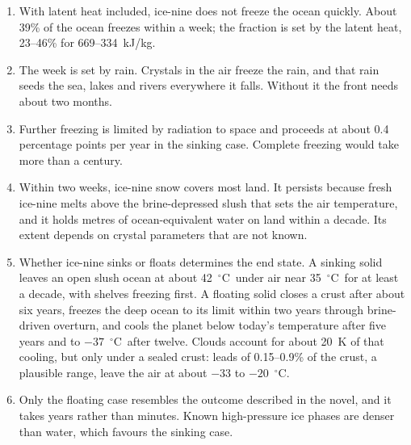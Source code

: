 \documentclass[11pt,a4paper]{article}
\newcommand{\degC}{$^{\circ}$C}
\begin{document}
\begin{enumerate}
\item With latent heat included, ice-nine does not freeze the ocean quickly. About 39\% of the ocean freezes within a week; the fraction is set by the latent heat, 23--46\% for 669--334~kJ/kg.
\item The week is set by rain. Crystals in the air freeze the rain, and that rain seeds the sea, lakes and rivers everywhere it falls. Without it the front needs about two months.
\item Further freezing is limited by radiation to space and proceeds at about 0.4 percentage points per year in the sinking case. Complete freezing would take more than a century.
\item Within two weeks, ice-nine snow covers most land. It persists because fresh ice-nine melts above the brine-depressed slush that sets the air temperature, and it holds metres of ocean-equivalent water on land within a decade. Its extent depends on crystal parameters that are not known.
\item Whether ice-nine sinks or floats determines the end state. A sinking solid leaves an open slush ocean at about 42~\degC\ under air near 35~\degC\ for at least a decade, with shelves freezing first. A floating solid closes a crust after about six years, freezes the deep ocean to its limit within two years through brine-driven overturn, and cools the planet below today's temperature after five years and to $-37$~\degC\ after twelve. Clouds account for about 20~K of that cooling, but only under a sealed crust: leads of 0.15--0.9\% of the crust, a plausible range, leave the air at about $-33$ to $-20$~\degC.
\item Only the floating case resembles the outcome described in the novel, and it takes years rather than minutes. Known high-pressure ice phases are denser than water, which favours the sinking case.
\end{enumerate}
\end{document}
